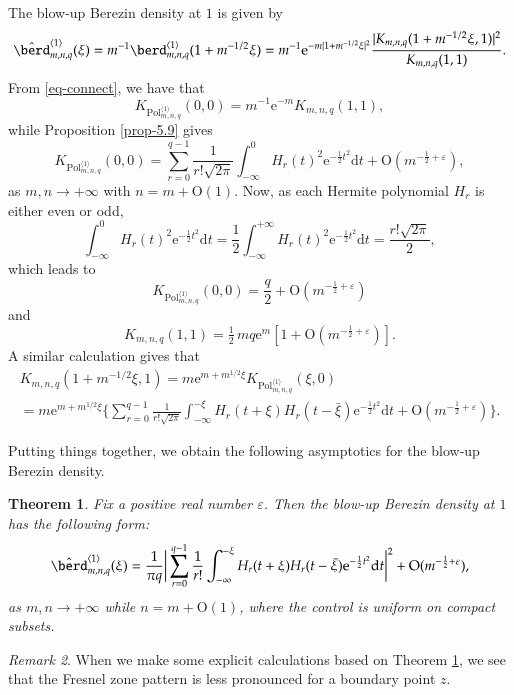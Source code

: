 \documentclass{birkart}
\newtheorem{thm}{Theorem}[section]
\theoremstyle{definition}
\theoremstyle{remark}
\newtheorem{rem}[thm]{Remark}
\numberwithin{equation}{section}
\numberwithin{figure}{section}
\newcommand{\e}{\mathrm e}
\newcommand{\1}{{\mathbf 1}}
\newcommand{\Ordo}{\mathrm{O}}
\newcommand{\diff}{{\mathrm d}}
\begin{document}
The blow-up Berezin density at $1$ is given by
\[
\hat\berd^{\langle1\rangle}_{m,n,q}(\xi)=m^{-1}
\berd^{\langle1\rangle}_{m,n,q}(1+m^{-1/2}\xi)=m^{-1}
\e^{-m|1+m^{-1/2}\xi|^2}
\frac{|K_{m,n,q}(1+m^{-1/2}\xi,1)|^2}{K_{m,n,q}(1,1)}.
\] 
From \eqref{eq-connect}, we have that
\begin{equation*}
K_{\mathrm{Pol}^{\langle1\rangle}_{m,n,q}}(0,0)=
m^{-1}\e^{-m}K_{m,n,q}(1,1),
\end{equation*}
while Proposition \ref{prop-5.9} gives 
\[
K_{\mathrm{Pol}^{\langle1\rangle}_{m,n,q}}(0,0)=
\sum_{r=0}^{q-1}\frac{1}{r! \sqrt{2 \pi}}
\int_{-\infty}^{0} H_r(t)^2\e^{-\frac12t^2} \diff t+
\Ordo(m^{-\frac12+\varepsilon}),
\]
as $m,n\to+\infty$ with $n=m+\Ordo(1)$.
Now, as each Hermite polynomial $H_r$ is either even or odd, 
\[
\int_{-\infty}^{0} H_r(t)^2\e^{-\frac12t^2} \diff t=\frac{1}{2}
\int_{-\infty}^{+\infty} H_r(t)^2\e^{-\frac12t^2} \diff t=
\frac{r!\sqrt{2\pi}}{2},
\]
which leads to 
\[
K_{\mathrm{Pol}^{\langle1\rangle}_{m,n,q}}(0,0)=
\frac{q}{2}+\Ordo(m^{-\frac12+\varepsilon})
\]
and  
\begin{equation*}
K_{m,n,q}(1,1)=\tfrac12\,mq\e^m[1+\Ordo(m^{-\frac12+\varepsilon})].
\end{equation*}
A similar calculation gives that
\begin{multline*}
K_{m,n,q}(1+m^{-1/2}\xi,1)=m\e^{m+m^{1/2}\xi}
K_{\mathrm{Pol}^{\langle1\rangle}_{m,n,q}}(\xi,0)
\\
=m\e^{m+m^{1/2}\xi}\bigg\{
\sum_{r=0}^{q-1}\frac{1}{r! \sqrt{2 \pi}}
\int_{-\infty}^{-\xi} H_r(t+\xi)
H_r(t-\bar\xi)\e^{-\frac12t^2} \diff t+
\Ordo(m^{-\frac12+\varepsilon})\bigg\}.
\end{multline*}

Putting things together, we obtain the following asymptotics for the blow-up 
Berezin density.

\begin{thm}
\label{thm-5.10}
Fix a positive real number $\varepsilon$. Then the blow-up Berezin density at
$1$ has the following form:
\[
\hat\berd^{\langle1\rangle}_{m,n,q}(\xi)=
\frac{1}{\pi q}\bigg|\sum_{r=0}^{q-1}\frac{1}{r!}
\int_{-\infty}^{-\xi} H_r(t+\xi)
H_r(t-\bar\xi)\e^{-\frac12t^2} \diff t\bigg|^2+
\Ordo(m^{-\frac12+\varepsilon}),
\]
as $m,n\to+\infty$ while $n=m+\Ordo(1)$, where the control is uniform on 
compact subsets. 
\end{thm}

\begin{rem}
When we make some explicit calculations based on Theorem \ref{thm-5.10}, 
we see that the Fresnel zone pattern is less pronounced for a boundary point
$z$.
\end{rem}
\medskip
\end{document}
